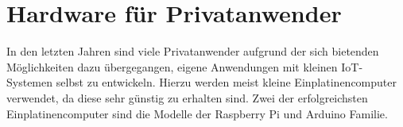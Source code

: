 \section{Hardware für Privatanwender}\label{s:DIY}

In den letzten Jahren sind viele Privatanwender aufgrund der sich bietenden Möglichkeiten dazu übergegangen, eigene Anwendungen mit kleinen \ac{IoT}-Systemen selbst zu entwickeln. Hierzu werden meist kleine Einplatinencomputer verwendet, da diese sehr günstig zu erhalten sind. 
Zwei der erfolgreichsten Einplatinencomputer sind die Modelle der Raspberry Pi und Arduino Familie.



